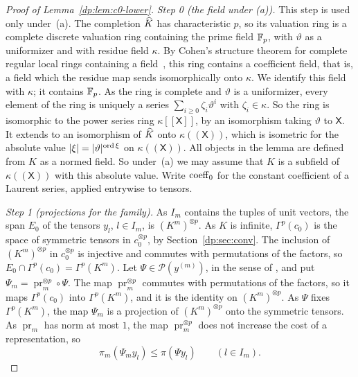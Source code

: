 \begin{proof}[Proof of Lemma~\ref{dp:lem:c0-lower}]
\emph{Step 0 (the field under (a)).} This step is used only under~(a). The completion $\widehat K$ has characteristic $p$, so its valuation ring is a complete discrete valuation ring containing the prime field $\mathbb F_p$, with $\vartheta$ as a uniformizer and with residue field $\kappa$. By Cohen's structure theorem for complete regular local rings containing a field~\cite{Co}, this ring contains a coefficient field, that is, a field which the residue map sends isomorphically onto $\kappa$. We identify this field with $\kappa$; it contains $\mathbb F_p$. As the ring is complete and $\vartheta$ is a uniformizer, every element of the ring is uniquely a series $\sum_{i\ge0}\zeta_i\vartheta^i$ with $\zeta_i\in\kappa$. So the ring is isomorphic to the power series ring $\kappa[[\mathsf X]]$, by an isomorphism taking $\vartheta$ to $\mathsf X$. It extends to an isomorphism of $\widehat K$ onto $\kappa((\mathsf X))$, which is isometric for the absolute value $\lvert \xi\rvert=\lvert \vartheta\rvert^{\operatorname{ord}\xi}$ on $\kappa((\mathsf X))$. All objects in the lemma are defined from $K$ as a normed field. So under~(a) we may assume that $K$ is a subfield of $\kappa((\mathsf X))$ with this absolute value. Write $\operatorname{coeff}_0$ for the constant coefficient of a Laurent series, applied entrywise to tensors.

\emph{Step 1 (projections for the family).} As $I_m$ contains the tuples of unit vectors, the span $E_0$ of the tensors $y_l$, $l\in I_m$, is $(K^m)^{\otimes p}$. As $K$ is infinite, $\Gamma^p(c_0)$ is the space of symmetric tensors in $c_0^{\otimes p}$, by Section~\ref{dp:sec:conv}. The inclusion of $(K^m)^{\otimes p}$ in $c_0^{\otimes p}$ is injective and commutes with permutations of the factors, so $E_0\cap\Gamma^p(c_0)=\Gamma^p(K^m)$. Let $\Psi\in\mathcal P(y^{(m)})$, in the sense of \cite[Definition~14.15]{I}, and put $\Psi_m=\operatorname{pr}_m^{\otimes p}\circ\Psi$. The map $\operatorname{pr}_m^{\otimes p}$ commutes with permutations of the factors, so it maps $\Gamma^p(c_0)$ into $\Gamma^p(K^m)$, and it is the identity on $(K^m)^{\otimes p}$. As $\Psi$ fixes $\Gamma^p(K^m)$, the map $\Psi_m$ is a projection of $(K^m)^{\otimes p}$ onto the symmetric tensors. As $\operatorname{pr}_m$ has norm at most $1$, the map $\operatorname{pr}_m^{\otimes p}$ does not increase the cost of a representation, so
\begin{equation}\label{dp:af:projection-cost}
 \pi_m(\Psi_my_l)\le\pi(\Psi y_l)\qquad(l\in I_m).
\end{equation}


\end{proof}
